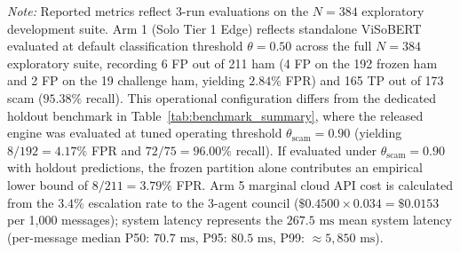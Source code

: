 \documentclass[journal]{IEEEtran}
\begin{document}
\begin{table}[t]
\centering
\caption{3-Run Median Comparative Benchmark Across System Architectures ($N=384$ Combined Development Samples, $\tau=0.90$)}
\label{tab:e2e_benchmark}
\par\vspace{6pt}
\parbox{\textwidth}{\footnotesize \textit{Note:} Reported metrics reflect 3-run evaluations on the $N=384$ exploratory development suite. Arm 1 (Solo Tier 1 Edge) reflects standalone ViSoBERT evaluated at default classification threshold $\theta = 0.50$ across the full $N=384$ exploratory suite, recording 6 FP out of 211 ham (4 FP on the 192 frozen ham and 2 FP on the 19 challenge ham, yielding $2.84\%$ FPR) and 165 TP out of 173 scam ($95.38\%$ recall). This operational configuration differs from the dedicated holdout benchmark in Table~\ref{tab:benchmark_summary}, where the released engine was evaluated at tuned operating threshold $\theta_{\text{scam}} = 0.90$ (yielding $8/192 = 4.17\%$ FPR and $72/75 = 96.00\%$ recall). If evaluated under $\theta_{\text{scam}}=0.90$ with holdout predictions, the frozen partition alone contributes an empirical lower bound of $8/211 = 3.79\%$ FPR. Arm 5 marginal cloud API cost is calculated from the $3.4\%$ escalation rate to the 3-agent council ($\$0.4500 \times 0.034 = \$0.0153$ per 1,000 messages); system latency represents the $267.5\text{ ms}$ mean system latency (per-message median P50: $70.7\text{ ms}$, P95: $80.5\text{ ms}$, P99: $\approx 5,850\text{ ms}$).}
\end{table}
\end{document}
